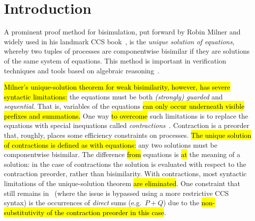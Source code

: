 \section{Introduction}

A prominent proof method for bisimulation, put forward by Robin Milner and widely used in his
landmark CCS book~\cite{Mil89}, is the
\emph{unique solution of equations}, whereby two tuples of processes are
componentwise bisimilar if they are solutions of the same system of equations.
This method is important in verification techniques and tools
based on algebraic reasoning~\cite{BaeBOOK,theoryAndPractice,RosUnder10}. 

\hl{Milner's unique-solution theorem for weak bisimilarity, however,
has severe syntactic limitations:}
the equations must be both \emph{(strongly) guarded} and \emph{sequential}. That is,
variables of the equations \hl{can only occur underneath visible prefixes and summations.}
One way \hl{to overcome} such limitations is to replace the equations
with special inequations called
\emph{contractions}~\cite{sangiorgi2015equations,sangiorgi2017equations}. Contraction is a
preorder that, roughly, places some efficiency constraints on processes.
\hl{The unique solution of contractions is defined as with equations:}
any two solutions must be componentwise bisimilar.
The difference \hl{from} equations is \hl{at} the meaning of a solution:
in the case of contractions the solution is evaluated with respect to
the contraction preorder, rather than bisimilarity. 
With contractions, most syntactic limitations of the unique-solution theorem \hl{are
eliminated}. One constraint that still remains
in~\cite{sangiorgi2017equations}
(where the issue is bypassed using a more
restrictive CCS syntax)
is the occurrences of \emph{direct} sums (e.g.~$P + Q$) due to
the \hl{non-substitutivity of the contraction preorder in this case}.

